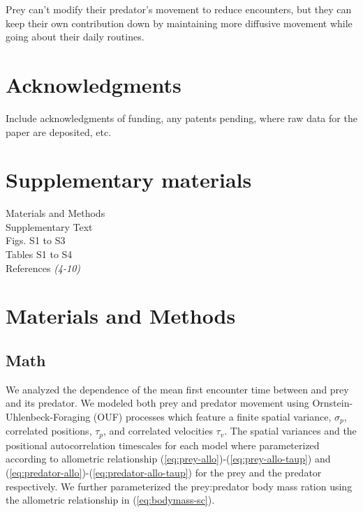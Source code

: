 \documentclass[12pt]{article}
\begin{document}
Prey can't modify their predator's movement to reduce encounters, but they can keep their own contribution down by maintaining more diffusive movement while going about their daily routines.











\section*{Acknowledgments}
Include acknowledgments of funding, any patents pending, where raw data for the paper are deposited, etc.

\section*{Supplementary materials}
Materials and Methods\\
Supplementary Text\\
Figs. S1 to S3\\
Tables S1 to S4\\
References \textit{(4-10)}


\section*{Materials and Methods}


\subsection*{Math}

We analyzed the dependence of the mean first encounter time between and prey and its predator. We modeled both prey and predator movement using Ornstein-Uhlenbeck-Foraging (OUF) processes \cite{Fleming:2014jr,Fleming:2014gd} which feature a finite spatial variance, $\sigma_p$, correlated positions, $\tau_p$, and correlated velocities $\tau_v$. The spatial variances and the positional autocorrelation timescales for each model where parameterized according to allometric relationship (\ref{eq:prey-allo})-(\ref{eq:prey-allo-taup}) and (\ref{eq:predator-allo})-(\ref{eq:predator-allo-taup}) for the prey and the predator respectively. We further parameterized the prey:predator body mass ration using the allometric relationship in (\ref{eq:bodymass-sc}). 
\end{document}
